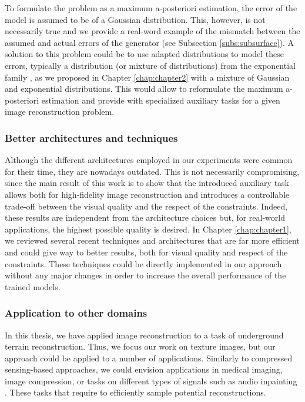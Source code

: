 To formulate the problem as a maximum a-posteriori estimation, the error of the model is assumed to be of a Gaussian distribution. This, however, is not necessarily true and we provide a real-word example of the mismatch between the assumed and actual errors of the generator (see Subsection \ref{subs:subsurface}). A solution to this problem could be to use adapted distributions to model these errors, typically a distribution (or mixture of distributions) from the exponential family \citep{Brown1986}, as we proposed in Chapter \ref{chap:chapter2} with a mixture of Gaussian and exponential distributions. This would allow to reformulate the maximum a-posteriori estimation and provide with specialized auxiliary tasks for a given image reconstruction problem.

\subsubsection*{Better architectures and techniques}

Although the different architectures employed in our experiments were common for their time, they are nowadays outdated. This is not necessarily compromising, since the main result of this work is to show that the introduced auxiliary task allows both for high-fidelity image reconstruction and introduces a controllable trade-off between the visual quality and the respect of the constraints. Indeed, these results are independent from the architecture choices but, for real-world applications, the highest possible quality is desired. In Chapter \ref{chap:chapter1}, we reviewed several recent techniques and architectures that are far more efficient and could give way to better results, both for visual quality and respect of the constraints. These techniques could be directly implemented in our approach without any major changes in order to increase the overall performance of the trained models.

\subsubsection*{Application to other domains}

In this thesis, we have applied image reconstruction to a task of underground terrain reconstruction. Thus, we focus our work on texture images, but our approach could be applied to a number of applications. Similarly to compressed sensing-based approaches, we could envision applications in medical imaging, image compression, or tasks on different types of signals such as audio inpainting \citep{Marafioti2018}. These tasks that require to efficiently sample potential reconstructions.

